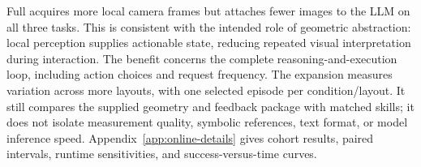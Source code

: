 Full acquires more local camera frames but attaches fewer images to the LLM on
all three tasks. This is consistent with the intended role of geometric
abstraction: local perception supplies actionable state, reducing repeated
visual interpretation during interaction. The benefit concerns the complete
reasoning-and-execution loop, including action choices and request frequency.
The expansion measures variation across more layouts, with one selected episode
per condition/layout. It still compares the supplied geometry and feedback package
with matched skills; it does not isolate measurement quality, symbolic references,
text format, or model inference speed. Appendix~\ref{app:online-details} gives
cohort results, paired intervals, runtime sensitivities, and success-versus-time
curves.
